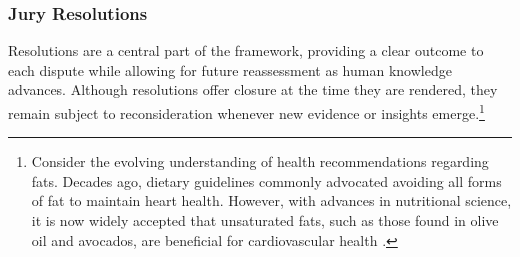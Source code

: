 \documentclass{article}
\begin{document}





\subsubsection{Jury Resolutions}

Resolutions are a central part of the framework, providing a clear outcome to each dispute while allowing for future reassessment as human knowledge advances. Although resolutions offer closure at the time they are rendered, they remain subject to reconsideration whenever new evidence or insights emerge.\footnote{Consider the evolving understanding of health recommendations regarding fats. Decades ago, dietary guidelines commonly advocated avoiding all forms of fat to maintain heart health. However, with advances in nutritional science, it is now widely accepted that unsaturated fats, such as those found in olive oil and avocados, are beneficial for cardiovascular health \cite{pacheco2022avocado}.}
\end{document}
